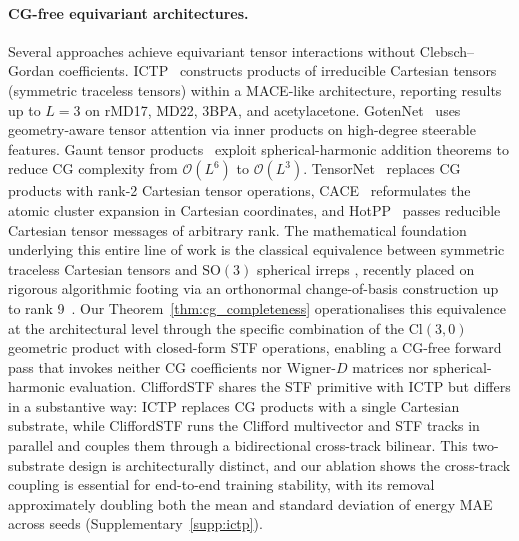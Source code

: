 \paragraph{CG-free equivariant architectures.}
Several approaches achieve equivariant tensor interactions without Clebsch--Gordan coefficients. ICTP~\citep{zaverkin2024ictp} constructs products of irreducible Cartesian tensors (symmetric traceless tensors) within a MACE-like architecture, reporting results up to $L{=}3$ on rMD17, MD22, 3BPA, and acetylacetone. GotenNet~\citep{aykent2025gotennet} uses geometry-aware tensor attention via inner products on high-degree steerable features. Gaunt tensor products~\citep{luo2024gaunt} exploit spherical-harmonic addition theorems to reduce CG complexity from $\mathcal{O}(L^6)$ to $\mathcal{O}(L^3)$. TensorNet~\citep{simeon2023tensornet} replaces CG products with rank-2 Cartesian tensor operations, CACE~\citep{cheng2024cace} reformulates the atomic cluster expansion in Cartesian coordinates, and HotPP~\citep{wang2024n} passes reducible Cartesian tensor messages of arbitrary rank. The mathematical foundation underlying this entire line of work is the classical equivalence between symmetric traceless Cartesian tensors and $\mathrm{SO}(3)$ spherical irreps \citep{coope1965irreducible,applequist1989traceless,thorne1980multipole,stone2013theory}, recently placed on rigorous algorithmic footing via an orthonormal change-of-basis construction up to rank 9~\citep{shao2025orthonormal}. Our Theorem~\ref{thm:cg_completeness} operationalises this equivalence at the architectural level through the specific combination of the $\mathrm{Cl}(3,0)$ geometric product with closed-form STF operations, enabling a CG-free forward pass that invokes neither CG coefficients nor Wigner-$D$ matrices nor spherical-harmonic evaluation. CliffordSTF shares the STF primitive with ICTP but differs in a substantive way: ICTP replaces CG products with a single Cartesian substrate, while CliffordSTF runs the Clifford multivector and STF tracks in parallel and couples them through a bidirectional cross-track bilinear. This two-substrate design is architecturally distinct, and our ablation shows the cross-track coupling is essential for end-to-end training stability, with its removal approximately doubling both the mean and standard deviation of energy MAE across seeds (Supplementary~\ref{supp:ictp}).

